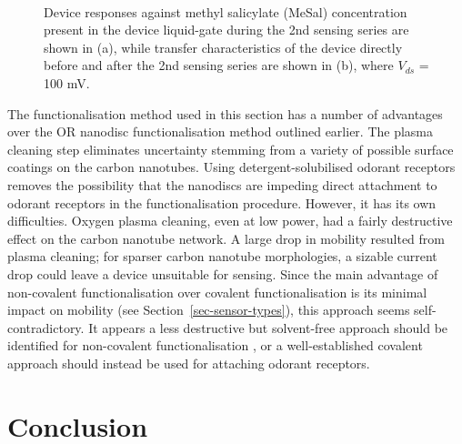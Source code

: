 \documentclass[
  a4paper,
]{scrbook}
\begin{document}
\begin{figure}
\begin{minipage}[t]{0.45\linewidth}
{{}

}

\end{minipage}%
%
\begin{minipage}[t]{0.01\linewidth}

{\centering 

~

}

\end{minipage}%

\caption[Device responses against methyl salicylate concentration
present in the device liquid-gate during the 2nd sensing series,
alongside transfer characteristics of the device directly before and
after the 2nd sensing series.]{\label{fig-OR10a-signal-TX}Device
responses against methyl salicylate (MeSal) concentration present in the
device liquid-gate during the 2nd sensing series are shown in (a), while
transfer characteristics of the device directly before and after the 2nd
sensing series are shown in (b), where \(V_{ds}\) = 100 mV.}

\end{figure}

The functionalisation method used in this section has a number of
advantages over the OR nanodisc functionalisation method outlined
earlier. The plasma cleaning step eliminates uncertainty stemming from a
variety of possible surface coatings on the carbon nanotubes. Using
detergent-solubilised odorant receptors removes the possibility that the
nanodiscs are impeding direct attachment to odorant receptors in the
functionalisation procedure. However, it has its own difficulties.
Oxygen plasma cleaning, even at low power, had a fairly destructive
effect on the carbon nanotube network. A large drop in mobility resulted
from plasma cleaning; for sparser carbon nanotube morphologies, a
sizable current drop could leave a device unsuitable for sensing. Since
the main advantage of non-covalent functionalisation over covalent
functionalisation is its minimal impact on mobility (see
Section~\ref{sec-sensor-types}), this approach seems self-contradictory.
It appears a less destructive but solvent-free approach should be
identified for non-covalent functionalisation \autocite{Ashraf2014}, or
a well-established covalent approach should instead be used for
attaching odorant receptors.

\hypertarget{conclusion-1}{%
\section{Conclusion}\label{conclusion-1}}
\end{document}
